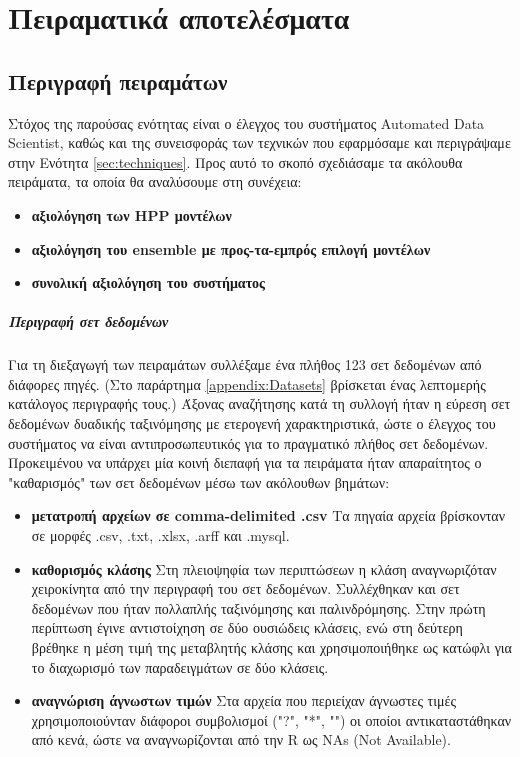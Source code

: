 \chapter{Πειραματικά αποτελέσματα}
\section{Περιγραφή πειραμάτων}
Στόχος της παρούσας ενότητας είναι ο έλεγχος του συστήματος Automated Data Scientist, καθώς και της συνεισφοράς των τεχνικών που εφαρμόσαμε και περιγράψαμε στην Ενότητα \ref{sec:techniques}. Προς αυτό το σκοπό σχεδιάσαμε τα ακόλουθα πειράματα, τα οποία θα αναλύσουμε στη συνέχεια:
\begin{itemize}
	\item \textbf{αξιολόγηση των HPP μοντέλων}
	\item \textbf{αξιολόγηση του ensemble με προς-τα-εμπρός επιλογή μοντέλων}
	\item \textbf{συνολική αξιολόγηση του συστήματος}
\end{itemize}

\paragraph{Περιγραφή σετ δεδομένων} Για τη διεξαγωγή των πειραμάτων συλλέξαμε ένα πλήθος 123 σετ δεδομένων από διάφορες πηγές. (Στο παράρτημα \ref{appendix:Datasets} βρίσκεται ένας λεπτομερής κατάλογος περιγραφής τους.) Άξονας αναζήτησης κατά τη συλλογή ήταν η εύρεση σετ δεδομένων δυαδικής ταξινόμησης με ετερογενή χαρακτηριστικά, ώστε ο έλεγχος του συστήματος να είναι αντιπροσωπευτικός για το πραγματικό πλήθος σετ δεδομένων. Προκειμένου να υπάρχει μία κοινή διεπαφή για τα πειράματα ήταν απαραίτητος ο "καθαρισμός" των σετ δεδομένων μέσω των ακόλουθων βημάτων:
\begin{itemize}
	\item \textbf{μετατροπή αρχείων σε comma-delimited .csv} Τα πηγαία αρχεία βρίσκονταν σε μορφές .csv, .txt, .xlsx, .arff και .mysql.
	\item \textbf{καθορισμός κλάσης} Στη πλειοψηφία των περιπτώσεων η κλάση αναγνωριζόταν χειροκίνητα από την περιγραφή του σετ δεδομένων. Συλλέχθηκαν και σετ δεδομένων που ήταν πολλαπλής ταξινόμησης και παλινδρόμησης. Στην πρώτη περίπτωση έγινε αντιστοίχηση σε δύο ουσιώδεις κλάσεις, ενώ στη δεύτερη βρέθηκε η μέση τιμή της μεταβλητής κλάσης και χρησιμοποιήθηκε ως κατώφλι για το διαχωρισμό των παραδειγμάτων σε δύο κλάσεις.
	\item \textbf{αναγνώριση άγνωστων τιμών} Στα αρχεία που περιείχαν άγνωστες τιμές χρησιμοποιούνταν διάφοροι συμβολισμοί ("?", "*", "") οι οποίοι αντικαταστάθηκαν από κενά, ώστε να αναγνωρίζονται από την R ως NAs (Not Available).  
\end{itemize}
